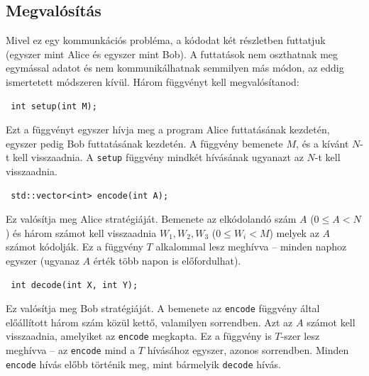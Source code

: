 \documentclass[12pt]{article}
\begin{document}
\subsection{Megvalósítás}
Mivel ez egy kommunkációs probléma, a kódodat két részletben futtatjuk (egyszer mint Alice és egyszer mint Bob). A futtatások nem oszthatnak meg egymással adatot és nem kommunikálhatnak semmilyen más módon, az eddig ismertetett módszeren kívül. Három függvényt kell megvalósítanod:

\begin{lstlisting}
 int setup(int M);
\end{lstlisting}

Ezt a függvényt egyszer hívja meg a program Alice futtatásának kezdetén, egyszer pedig Bob futtatásának kezdetén. A függvény bemenete $M$, és a kívánt $N$-t kell visszaadnia. A \texttt{setup} függvény mindkét hívásának ugyanazt az $N$-t kell visszaadnia.

\begin{lstlisting}
 std::vector<int> encode(int A);
\end{lstlisting}

Ez valósítja meg Alice stratégiáját. Bemenete az elkódolandó szám $A$ ($0 \leq A < N$) és három számot kell visszaadnia $W_1, W_2, W_3$ ($0 \leq W_i < M$) melyek az $A$ számot kódolják. Ez a függvény $T$ alkalommal lesz meghívva -- minden naphoz egyszer (ugyanaz $A$ érték több napon is előfordulhat).

\begin{lstlisting}
 int decode(int X, int Y);
\end{lstlisting}

Ez valósítja meg Bob stratégiáját. A bemenete az \texttt{encode} függvény által előállított három szám közül kettő, valamilyen sorrendben. Azt az $A$ számot kell visszaadnia, amelyiket az \texttt{encode} megkapta. Ez a függvény is $T$-szer lesz meghívva -- az \texttt{encode} mind a $T$ hívásához egyszer, azonos sorrendben. Minden \texttt{encode} hívás előbb történik meg, mint bármelyik \texttt{decode} hívás.
\end{document}
